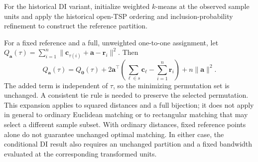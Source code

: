 \State For the historical DI variant, initialize weighted \(k\)-means
at the observed sample units and apply the historical open-TSP ordering and
inclusion-probability refinement to construct the reference partition.
\label{line:upbkm}

For a fixed reference and a full, unweighted one-to-one assignment,
let \(Q_{\bm a}(\tau)=\sum_{i=1}^n
\|\bm c_{\tau(i)}+\bm a-\bm r_i\|^2\). Then
\[
Q_{\bm a}(\tau)=Q_{\bm0}(\tau)
+2\bm a^\top\left(\sum_{\ell\in s}\bm c_\ell-
\sum_{i=1}^n\bm r_i\right)+n\|\bm a\|^2.
\]
The added term is independent of \(\tau\), so the minimizing permutation
set is unchanged. A consistent tie rule is needed to preserve the selected
permutation. This expansion applies to squared distances and a full
bijection; it does not apply in general to ordinary Euclidean matching or
to rectangular matching that may select a different sample subset.
With ordinary distances, fixed reference points alone do not guarantee
unchanged optimal matching. In either case, the conditional DI result also
requires an unchanged partition and a fixed bandwidth evaluated at the
corresponding transformed units.
